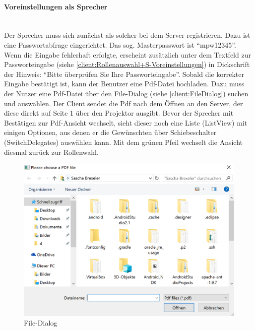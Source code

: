 \paragraph{Voreinstellungen als Sprecher}$\;$\\
Der Sprecher muss sich zunächst als solcher bei dem Server registrieren. Dazu ist eine Passwortabfrage eingerichtet. Das sog. Masterpasswort ist "`mpw12345"'. Wenn die Eingabe fehlerhaft erfolgte, erscheint zusätzlich unter dem Textfeld zur Passworteingabe (siehe \autoref{client:Rollenauswahl+S-Voreinstellungen}) in Dickschrift der Hinweis: "`Bitte überprüfen Sie Ihre Passworteingabe"'. Sobald die korrekter Eingabe bestätigt ist, kann der Benutzer eine Pdf-Datei hochladen. Dazu muss der Nutzer eine Pdf-Datei über den File-Dialog (siehe \autoref{client:FileDialog}) suchen und auswählen. Der Client sendet die Pdf nach dem Öffnen an den Server, der diese direkt auf Seite 1 über den Projektor ausgibt. Bevor der Sprecher mit Bestätigen zur Pdf-Ansicht wechselt, sieht dieser noch eine Liste (ListView) mit einigen Optionen, aus denen er die Gewünschten über Schiebeschalter (SwitchDelegates) auswählen kann. Mit dem grünen Pfeil wechselt die Ansicht diesmal zurück zur Rollenwahl.

\begin{figure}[ht!]
	\centering
	\includegraphics[scale=0.7]{GUI/Bilder/3-S-4-Voreinstellung.PNG}
	\caption{File-Dialog{\tiny}}
	\label{client:FileDialog}
\end{figure}

\newpage

